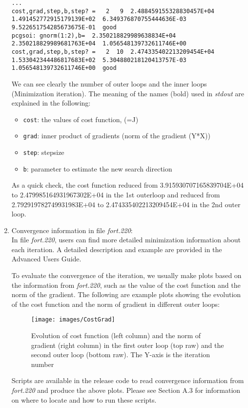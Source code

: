 \begin{enumerate}
\begin{tiny}
\begin{verbatim}
...
cost,grad,step,b,step? =   2   9  2.488459155328830457E+04  1.491452772915179139E+02  6.349376870755444636E-03  9.522651754285673675E-01  good
pcgsoi: gnorm(1:2),b=  2.350218829989638834E+04  2.350218829989681763E+04  1.056548139732611746E+00
cost,grad,step,b,step? =   2  10  2.474335402213209454E+04  1.533042344486817683E+02  5.304880218120413757E-03  1.056548139732611746E+00  good

\end{verbatim}
\end{tiny}
We can see clearly the number of outer loops and the inner loops (Minimization iteration). The meaning of the names (bold) used in \textit{stdout} are explained in the following:

\begin{itemize}
\item \verb|cost|: the values of cost function, (=J)
\item \verb|grad|: inner product of gradients (norm of the gradient (Y*X))
\item \verb|step|: stepsize
\item \verb|b|: parameter to estimate the new search direction 
\end{itemize}

As a quick check, the cost function reduced from 3.915930707165839704E+04 to 2.479985164931967302E+04 in the 1st outerloop and reduced from 2.792919782749931983E+04 to 2.474335402213209454E+04 in the 2nd outer loop.

\item Convergence information in file \textit{fort.220}:\\


In file \textit{fort.220}, users can find more detailed minimization information about each iteration. A detailed description and example are provided in the Advanced User\textquotesingle s Guide.

To evaluate the convergence of the iteration, we usually make plots based on the information from \textit{fort.220}, such as the value of the cost function and the norm of the gradient. The following are example plots showing the evolution of the cost function and the norm of gradient in different outer loops:

\begin{figure}[h!]
  \centering
  \texttt{[image: images/CostGrad]}
  \caption{Evolution of cost function (left column) and the norm of gradient (right column) in the first outer loop (top raw) and the second outer loop (bottom raw). The Y-axis is the iteration number}
  \label{fig:costgrad}
\end{figure}

Scripts are available in the release code to read convergence information from \textit{fort.220} and produce the above plots. Please see Section A.3 for information on where to locate and how to run these scripts.
\end{enumerate}

